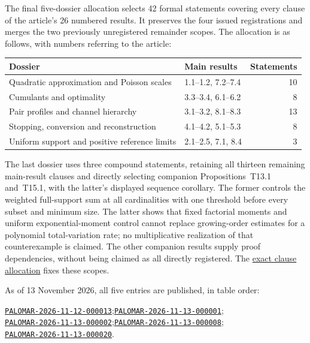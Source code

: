 The final five-dossier allocation selects 42 formal statements covering every
clause of the article's 26 numbered results. It preserves the four issued
registrations and merges the two previously unregistered remainder scopes.
The allocation is as follows, with numbers referring to the article:
\begin{center}
\small
\begin{tabularx}{\linewidth}{@{}Xlr@{}}
\toprule
Dossier & Main results & Statements\\
\midrule
Quadratic approximation and Poisson scales & 1.1--1.2, 7.2--7.4 & 10\\
Cumulants and optimality & 3.3--3.4, 6.1--6.2 & 8\\
Pair profiles and channel hierarchy & 3.1--3.2, 8.1--8.3 & 13\\
Stopping, conversion and reconstruction & 4.1--4.2, 5.1--5.3 & 8\\
Uniform support and positive reference limits & 2.1--2.5, 7.1, 8.4 & 3\\
\bottomrule
\end{tabularx}
\end{center}
The last dossier uses three compound statements, retaining all thirteen
remaining main-result clauses and directly selecting companion
Propositions~T13.1 and~T15.1, with
the latter's displayed sequence corollary. The former controls the weighted
full-support sum at all cardinalities with one threshold before every subset
and minimum size. The latter shows that fixed factorial moments and uniform
exponential-moment control cannot replace growing-order estimates for a
polynomial total-variation rate; no multiplicative realization of that
counterexample is claimed. The other companion results supply proof
dependencies, without being claimed as all directly registered.
The \href{https://github.com/Vulkin-prog/paper-p1-lean/blob/eeda0e055bc16afa6bb6402727afe733ace9961e/palomar/REGISTRATION_PLAN_FINAL.json}{exact clause allocation} fixes these scopes.

As of 13 November 2026, all five entries are published, in table order:
\par\smallskip\noindent
\href{https://palomar-registry.org/entry.html?id=PALOMAR-2026-11-12-000013\&version=1}{\texttt{PALOMAR-2026-11-12-000013}};\quad \href{https://palomar-registry.org/entry.html?id=PALOMAR-2026-11-13-000001\&version=1}{\texttt{PALOMAR-2026-11-13-000001}};\\
\href{https://palomar-registry.org/entry.html?id=PALOMAR-2026-11-13-000002\&version=1}{\texttt{PALOMAR-2026-11-13-000002}};\quad \href{https://palomar-registry.org/entry.html?id=PALOMAR-2026-11-13-000008\&version=1}{\texttt{PALOMAR-2026-11-13-000008}};\\
\href{https://palomar-registry.org/entry.html?id=PALOMAR-2026-11-13-000020\&version=1}{\texttt{PALOMAR-2026-11-13-000020}}.

